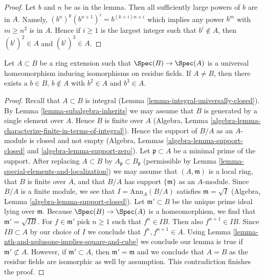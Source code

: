 \begin{proof}
Let $b$ and $n$ be as in the lemma.
Then all sufficiently large powers of $b$ are in $A$.
Namely, $(b^n)^k(b^{n + 1})^i = b^{(k + i)n + i}$
which implies any power $b^m$ with $m \geq n^2$ is in $A$.
Hence if $i \geq 1$ is the largest integer such that
$b^i \not \in A$, then $(b^i)^2 \in A$ and $(b^i)^3 \in A$.
\end{proof}

\begin{lemma}
\label{lemma-square-and-cube}
Let $A \subset B$ be a ring extension such that $\Spec(B) \to \Spec(A)$
is a universal homeomorphism inducing isomorphisms on residue fields.
If $A \not = B$, then there exists a $b \in B$, $b \not \in A$ with
$b^2 \in A$ and $b^3 \in A$.
\end{lemma}

\begin{proof}
Recall that $A \subset B$ is integral
(Lemma \ref{lemma-integral-universally-closed}).
By Lemma \ref{lemma-subalgebra-inherits}
we may assume that $B$ is generated by a single element
over $A$. Hence $B$ is finite over $A$
(Algebra, Lemma \ref{algebra-lemma-characterize-finite-in-terms-of-integral}).
Hence the support of $B/A$ as an $A$-module is
closed and not empty (Algebra, Lemmas
\ref{algebra-lemma-support-closed} and \ref{algebra-lemma-support-zero}).
Let $\mathfrak p \subset A$ be a minimal prime
of the support. After replacing $A \subset B$ by
$A_\mathfrak p \subset B_\mathfrak p$ (permissible by
Lemma \ref{lemma-special-elements-and-localization})
we may assume that $(A, \mathfrak m)$ is a local ring,
that $B$ is finite over $A$, and that $B/A$ has support $\{\mathfrak m\}$
as an $A$-module. Since $B/A$ is a finite module,
we see that $I = \text{Ann}_A(B/A)$ satisfies $\mathfrak m = \sqrt{I}$
(Algebra, Lemma \ref{algebra-lemma-support-closed}).
Let $\mathfrak m' \subset B$ be the unique prime ideal lying over
$\mathfrak m$. Because $\Spec(B) \to \Spec(A)$ is a homeomorphism,
we find that $\mathfrak m' = \sqrt{IB}$.
For $f \in \mathfrak m'$ pick $n \geq 1$ such that
$f^n \in IB$. Then also $f^{n + 1} \in IB$.
Since $IB \subset A$ by our choice of $I$ we conclude that
$f^n, f^{n + 1} \in A$. Using
Lemma \ref{lemma-nth-and-nplusone-implies-square-and-cube}
we conclude our lemma is true if $\mathfrak m' \not \subset A$.
However, if $\mathfrak m' \subset A$, then $\mathfrak m' = \mathfrak m$
and we conclude that $A = B$ as the residue fields
are isomorphic as well by assumption. This contradiction
finishes the proof.
\end{proof}

